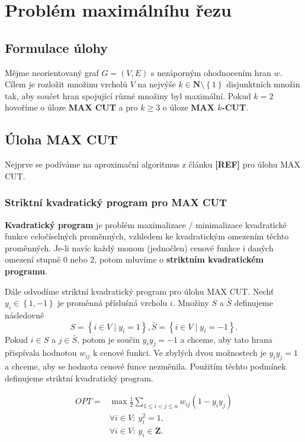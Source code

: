 \chapter{Problém maximálníhu řezu}

\section{Formulace úlohy}

Mějme neorientovaný graf $G = (V, E)$ s nezáporným ohodnocením hran $w$. Cílem je rozložit množinu vrcholů $V$ na nejvýše $k \in \mathbf{N} \setminus \left\{ 1 \right\}$ disjunktních množin tak, aby součet hran spojující různé množiny byl maximální. Pokud $k = 2$ hovoříme o úloze \textbf{MAX CUT} a pro $k \geq 3$ o úloze \textbf{MAX $k$-CUT}.

\section{Úloha MAX CUT}

Nejprve se podíváme na aproximační algoritmus z článku \textbf{[REF]} pro úlohu MAX CUT.

\subsection*{Striktní kvadratický program pro MAX CUT}

\textbf{Kvadratický program} je problém maximalizace / minimalizace kvadratické funkce celočíselných proměnných, vzhledem ke kvadratickým omezením těchto proměnných. Je-li navíc každý monom (jednočlen) cenové funkce i daných omezení stupně $0$ nebo $2$, potom mluvíme o \textbf{striktním kvadratickém programu}.

Dále odvodíme striktní kvadratický program pro úlohu MAX CUT. Nechť $y_i \in \left\{ 1, -1 \right\}$ je proměnná příslušná vrcholu $i$. Množiny $S$ a $\bar{S}$ definujeme následovně
$$
    S = \left\{ i \in V \mid y_i = 1 \right\}, \bar{S} = \left\{ i \in V \mid y_i = -1 \right\}.
$$
Pokud $i \in S$ a $j \in \bar{S}$, potom je součin $y_i y_j = -1$ a chceme, aby tato hrana přispívala hodnotou $w_{ij}$ k cenové funkci. Ve zbylých dvou možnostech je $y_i y_j = 1$ a chceme, aby se hodnota cenové funce nezměnila. Použitím těchto podmínek definujeme striktní kvadratický program.

\begin{equation}\tag{SQ-MAX-CUT}
    \begin{split}
        OPT = &\max \frac{1}{2} \sum_{1 \leq i < j \leq n} w_{ij} (1 - y_i y_j) \\
        &\forall i \in V:\ y_i^2 = 1, \\
        &\forall i \in V:\ y_i \in \mathbf{Z}.
    \end{split}
    \label{eq:SQ-MAX-CUT}
\end{equation}


